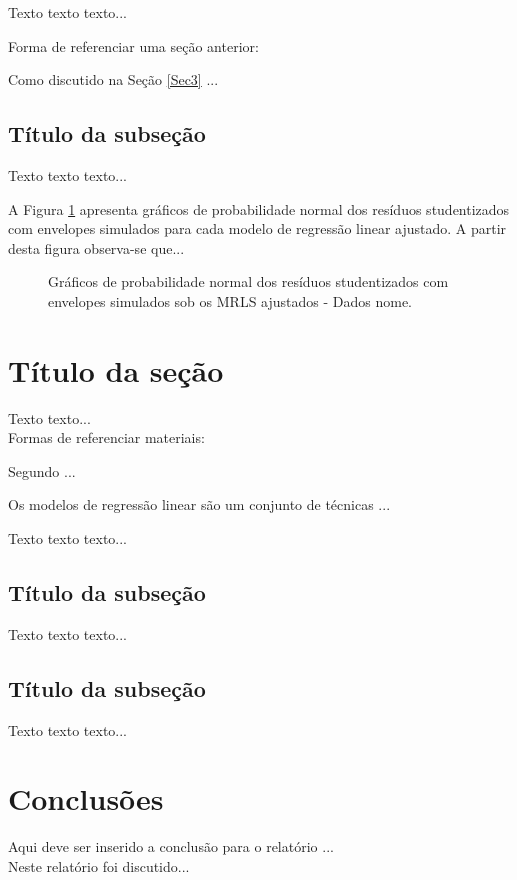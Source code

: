 \documentclass[12pt, a4paper, twoside]{article}
\numberwithin{equation}{subsection} %
\begin{document}
Texto texto texto...

Forma de referenciar uma seção anterior:

Como discutido na Seção \ref{Sec3} ... \\

\subsection{Título da subseção}

Texto texto texto...

A Figura \ref{ENVELOPES1}  apresenta gráficos de probabilidade normal dos resíduos studentizados com envelopes simulados para cada modelo de regressão linear ajustado. A partir desta figura observa-se que...
\begin{figure}[!htb]
	\centering
	\qquad
    \qquad
    \qquad
	\caption{Gráficos de probabilidade normal dos resíduos studentizados com envelopes simulados sob os MRLS ajustados - Dados nome. }
	\label{ENVELOPES1}
\end{figure}

\section{Título da seção}\label{Sec4}

Texto texto...\\

Formas de referenciar materiais:

Segundo  ...

Os modelos de regressão linear \cite{montgomery2012} são um conjunto de técnicas ...

Texto texto texto...

\subsection{Título da subseção}

Texto texto texto...

\subsection{Título da subseção}

Texto texto texto...

\section{Conclusões}

Aqui deve ser inserido a conclusão para o relatório ...\\


Neste relatório foi discutido...

\end{document}
